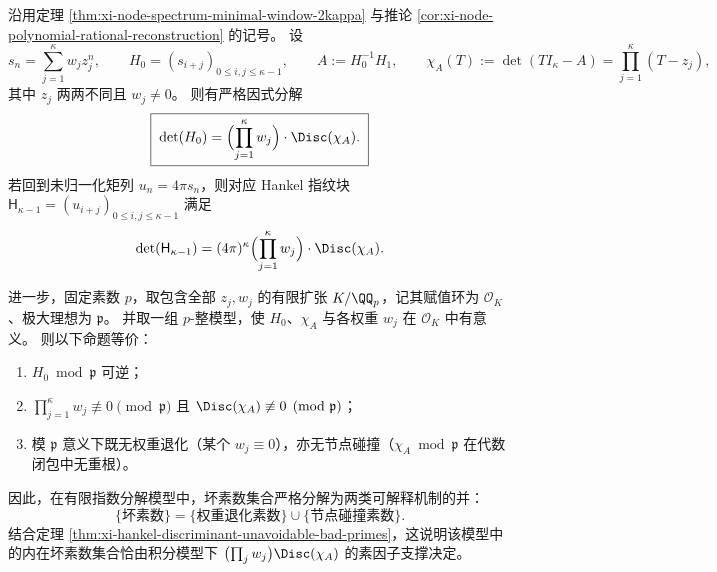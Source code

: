 \begin{theorem}[有限指数分解下坏素数的二因子分解]\label{thm:xi-gramshift-bad-primes-weight-discriminant}
沿用定理 \ref{thm:xi-node-spectrum-minimal-window-2kappa} 与推论 \ref{cor:xi-node-polynomial-rational-reconstruction} 的记号。
设
\[
s_n=\sum_{j=1}^{\kappa}w_j z_j^n,
\qquad
H_0=(s_{i+j})_{0\le i,j\le \kappa-1},
\qquad
A:=H_0^{-1}H_1,
\qquad
\chi_A(T):=\det(TI_\kappa-A)=\prod_{j=1}^{\kappa}(T-z_j),
\]
其中 \(z_j\) 两两不同且 \(w_j\neq 0\)。
则有严格因式分解
\begin{equation}\label{eq:xi-gramshift-hankel-det-weight-disc-factorization}
\boxed{\;
\det(H_0)
=
\Bigl(\prod_{j=1}^{\kappa}w_j\Bigr)\cdot \Disc(\chi_A).
\;}
\end{equation}
若回到未归一化矩列 \(u_n=4\pi s_n\)，则对应 Hankel 指纹块 \(\mathsf H_{\kappa-1}=(u_{i+j})_{0\le i,j\le \kappa-1}\) 满足
\[
\det(\mathsf H_{\kappa-1})
=(4\pi)^\kappa
\Bigl(\prod_{j=1}^{\kappa}w_j\Bigr)\cdot \Disc(\chi_A).
\]
\par
进一步，固定素数 \(p\)，取包含全部 \(z_j,w_j\) 的有限扩张 \(K/\QQ_p\)，记其赋值环为 \(\mathcal O_K\)、极大理想为 \(\mathfrak p\)。
并取一组 \(p\)-整模型，使 \(H_0\)、\(\chi_A\) 与各权重 \(w_j\) 在 \(\mathcal O_K\) 中有意义。
则以下命题等价：
\begin{enumerate}
  \item \(H_0\bmod \mathfrak p\) 可逆；
  \item \(\prod_{j=1}^{\kappa}w_j\not\equiv 0\pmod{\mathfrak p}\) 且 \(\Disc(\chi_A)\not\equiv 0\pmod{\mathfrak p}\)；
  \item 模 \(\mathfrak p\) 意义下既无权重退化（某个 \(w_j\equiv 0\)），亦无节点碰撞（\(\chi_A\bmod \mathfrak p\) 在代数闭包中无重根）。
\end{enumerate}
因此，在有限指数分解模型中，坏素数集合严格分解为两类可解释机制的并：
\[
\{\text{坏素数}\}
=
\{\text{权重退化素数}\}\cup\{\text{节点碰撞素数}\}.
\]
结合定理 \ref{thm:xi-hankel-discriminant-unavoidable-bad-primes}，这说明该模型中的内在坏素数集合恰由积分模型下
\(
\bigl(\prod_j w_j\bigr)\Disc(\chi_A)
\)
的素因子支撑决定。
\end{theorem}


